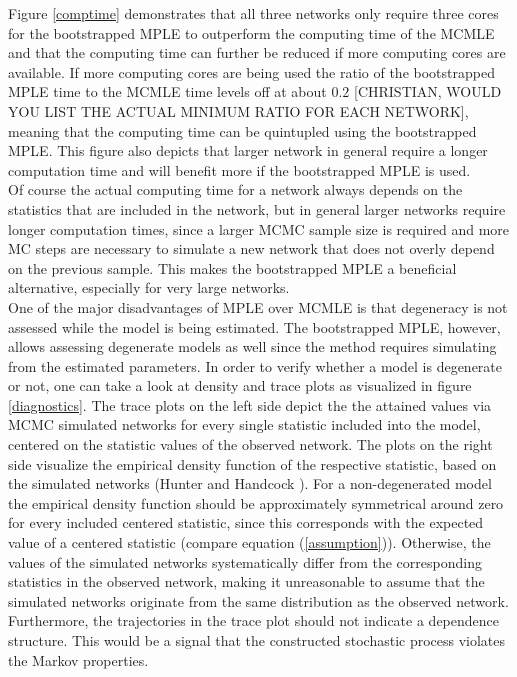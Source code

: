\documentclass[10pt, conference, compsocconf]{IEEEtran}
\begin{document}
Figure \ref{comptime} demonstrates that all three networks only require three cores for the bootstrapped MPLE to outperform the computing time of the MCMLE and that the computing time can further be reduced if more computing cores are available. If more computing cores are being used the ratio of the bootstrapped MPLE time to the MCMLE time levels off at about $0.2$ [CHRISTIAN, WOULD YOU LIST THE ACTUAL MINIMUM RATIO FOR EACH NETWORK], meaning that the computing time can be quintupled using the bootstrapped MPLE. This figure also depicts that larger network in general require a longer computation time and will benefit more if the bootstrapped MPLE is used.\\ 
Of course the actual computing time for a network always depends on the statistics that are included in the network, but in general larger networks require longer computation times, since a larger MCMC sample size is required and more MC steps are necessary to simulate a new network that does not overly depend on the previous sample. This makes the bootstrapped MPLE a beneficial alternative, especially for very large networks. \\[0.3cm]
One of the major disadvantages of MPLE over MCMLE is that degeneracy is not assessed while the model is being estimated.  The bootstrapped MPLE, however, allows assessing degenerate models as well since the method requires simulating from the estimated parameters. In order to verify whether a model is degenerate or not, one can take a look at density and trace plots as visualized in figure \ref{diagnostics}. The trace plots on the left side depict the the attained values via MCMC simulated networks for every single statistic included into the model, centered on the statistic values of the observed network. The plots on the right side visualize the empirical density function of the respective statistic, based on the simulated networks (Hunter and Handcock \cite{Hunter.2006}). For a non-degenerated model the empirical density function should be approximately symmetrical around zero for every included centered statistic, since this corresponds with the expected value of a centered statistic (compare equation (\ref{assumption})). 
Otherwise, the values of the simulated networks systematically differ from the corresponding statistics in the observed network, making it unreasonable to assume that the simulated networks originate from the same distribution as the observed network. Furthermore, the trajectories in the trace plot should not indicate a dependence structure. This would be a signal that the constructed stochastic process violates the Markov properties.
\end{document}
